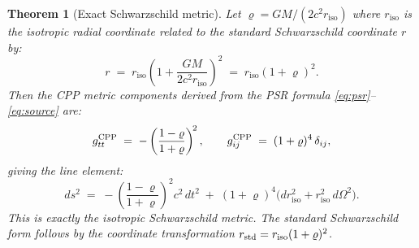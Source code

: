 \documentclass[12pt]{article}
\newtheorem{theorem}{Theorem}[section]
\newcommand{\riso}{r_{\mathrm{iso}}}
\newcommand{\vrho}{\varrho}   %
\begin{document}
\begin{theorem}[Exact Schwarzschild metric]
\label{thm:schwarzschild}
Let $\vrho = GM/(2c^2\riso)$ where $\riso$ is the isotropic radial
coordinate related to the standard Schwarzschild coordinate $r$ by:
\begin{equation}
  r \;=\; \riso\!\left(1 + \frac{GM}{2c^2\riso}\right)^{\!2}
  \;=\; \riso(1+\vrho)^2.
  \label{eq:iso_coord}
\end{equation}
Then the CPP metric components derived from the PSR formula
\eqref{eq:psr}--\eqref{eq:source} are:
\begin{equation}
  g_{tt}^{\rm CPP} \;=\;
  -\left(\frac{1-\vrho}{1+\vrho}\right)^{\!2},
  \qquad
  g_{ij}^{\rm CPP} \;=\; (1+\vrho)^4\,\delta_{ij},
  \label{eq:cpp_metric}
\end{equation}
giving the line element:
\begin{equation}
  \boxed{ds^2 \;=\;
  -\left(\frac{1-\vrho}{1+\vrho}\right)^{\!2}c^2\,dt^2
  \;+\; (1+\vrho)^4
  \bigl(d\riso^2 + \riso^2\,d\Omega^2\bigr).}
  \label{eq:isotropic_schw}
\end{equation}
This is \emph{exactly} the isotropic Schwarzschild metric.  The
standard Schwarzschild form follows by the coordinate transformation
$r_{\rm std} = \riso(1+\vrho)^2$.
\end{theorem}
\end{document}
